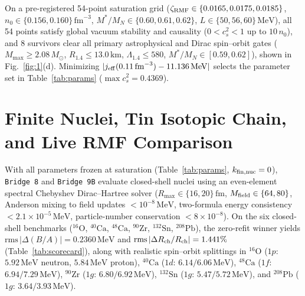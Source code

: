 \documentclass[aps,prc,twocolumn,superscriptaddress,nofootinbib,floatfix]{revtex4-2}
\begin{document}
On a pre-registered 54-point saturation grid ($\zeta_{\rm RMF} \in \{0.0165, 0.0175, 0.0185\}$, $n_0 \in \{0.156, 0.160\}\,\mathrm{fm}^{-3}$, $M^*/M_N \in \{0.60, 0.61, 0.62\}$, $L \in \{50, 56, 60\}\,\mathrm{MeV}$), all 54 points satisfy global vacuum stability and causality ($0 < c_s^2 < 1$ up to $10\,n_0$), and 8 survivors clear all primary astrophysical and Dirac spin--orbit gates ($M_{\max} \ge 2.08\,M_\odot$, $R_{1.4} \le 13.0\,\mathrm{km}$, $\Lambda_{1.4} \le 580$, $M^*/M_N \in [0.59, 0.62]$), shown in Fig.~\ref{fig:1}(d). Minimizing $|j_{\rm eff}(0.11\,\mathrm{fm}^{-3}) - 11.136\,\mathrm{MeV}|$ selects the parameter set in Table~\ref{tab:params} ($\max c_s^2 = 0.4369$).

\section{Finite Nuclei, Tin Isotopic Chain, and Live RMF Comparison}\label{sec:nuclei}

With all parameters frozen at saturation (Table~\ref{tab:params}, $k_{\rm fin,nuc} = 0$), \texttt{Bridge 8} and \texttt{Bridge 9B} evaluate closed-shell nuclei using an even-element spectral Chebyshev Dirac--Hartree solver ($R_{\max} \in \{16, 20\}\,\mathrm{fm}$, $M_{\rm field} \in \{64, 80\}$, Anderson mixing to field updates $< 10^{-8}\,\mathrm{MeV}$, two-formula energy consistency $< 2.1\times 10^{-5}\,\mathrm{MeV}$, particle-number conservation $< 8\times 10^{-8}$). On the six closed-shell benchmarks ($^{16}\mathrm{O}$, $^{40}\mathrm{Ca}$, $^{48}\mathrm{Ca}$, $^{90}\mathrm{Zr}$, $^{132}\mathrm{Sn}$, $^{208}\mathrm{Pb}$), the zero-refit winner yields $\mathrm{rms}\,|\Delta(B/A)| = 0.2360\,\mathrm{MeV}$ and $\mathrm{rms}\,|\Delta R_{\rm ch}/R_{\rm ch}| = 1.441\%$ (Table~\ref{tab:scorecard}), along with realistic spin--orbit splittings in $^{16}\mathrm{O}$ ($1p$: $5.92\,\mathrm{MeV}$ neutron, $5.84\,\mathrm{MeV}$ proton), $^{40}\mathrm{Ca}$ ($1d$: $6.14/6.06\,\mathrm{MeV}$), $^{48}\mathrm{Ca}$ ($1f$: $6.94/7.29\,\mathrm{MeV}$), $^{90}\mathrm{Zr}$ ($1g$: $6.80/6.92\,\mathrm{MeV}$), $^{132}\mathrm{Sn}$ ($1g$: $5.47/5.72\,\mathrm{MeV}$), and $^{208}\mathrm{Pb}$ ($1g$: $3.64/3.93\,\mathrm{MeV}$).
\end{document}
